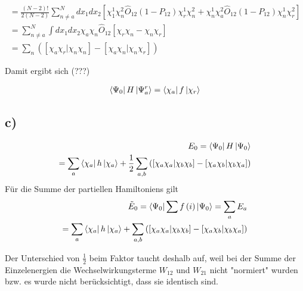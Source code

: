 \begin{align}
= \frac{\left( N - 2 \right)!}{2 \left( N-2 \right)} \sum_{n \neq a}^N dx_1 dx_2 \left[\chi_1^1 \chi_n^2 \hat{O}_{12} \left( 1-P_{12} \right) \chi_r^1 \chi_n^2 + \chi_n^1 \chi_a^2 \hat{O}_{12} \left(1-P_{12} \right) \chi_n^1 \chi_r^2 \right]\\
= \sum_{n \neq a}^N \int dx_1 dx_2 \chi_a \chi_n \hat{O}_{12} \left[ \chi_r \chi_n - \chi_n \chi_r \right] \\
= \sum_n \left( \left[ \chi_a \chi_r | \chi_n \chi_n \right] - \left[ \chi_a \chi_n | \chi_n \chi_r \right] \right)
\end{align}

Damit ergibt sich (???)

\begin{align}
\Bra{\Psi_0} H \Ket{\Psi_a^r} = \Bra{\chi_a} f  \Ket{\chi_r}
\end{align}

\subsection{c)}

\begin{align}
E_0 = \Bra{\Psi_0} H \Ket{\Psi_0} \\
= \sum_a \Bra{\chi_a} h  \Ket{\chi_a} + \frac{1}{2} \sum_{a,b} \left( \left[ \chi_a \chi_a | \chi_b \chi_b \right] - \left[ \chi_a \chi_b | \chi_b \chi_a \right] \right)
\end{align}
F\"ur die Summe der partiellen Hamiltoniens gilt
\begin{align}
\tilde{E}_0 = \Bra{\Psi_0} \sum f \left( i \right) \Ket{\Psi_0} = \sum_a E_a \\
= \sum_a \Bra{\chi_a} h  \Ket{\chi_a} + \sum_{a,b} \left( \left[ \chi_a \chi_a | \chi_b \chi_b \right] - \left[ \chi_a \chi_b | \chi_b \chi_a \right] \right)
\end{align}

Der Unterschied von $\frac{1}{2}$ beim Faktor taucht deshalb auf, weil bei der Summe der Einzelenergien die Wechselwirkungsterme $W_{12}$ und $W_{21}$ nicht "normiert" wurden bzw. es wurde nicht ber\"ucksichtigt, dass sie identisch sind.
